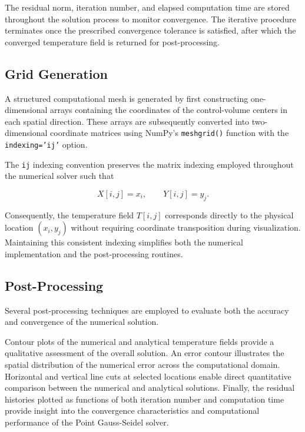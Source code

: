 The residual norm, iteration number, and elapsed computation time are stored throughout the solution process to monitor convergence. The iterative procedure terminates once the prescribed convergence tolerance is satisfied, after which the converged temperature field is returned for post-processing.


\subsection{Grid Generation}

A structured computational mesh is generated by first constructing one-dimensional arrays containing the coordinates of the control-volume centers in each spatial direction. These arrays are subsequently converted into two-dimensional coordinate matrices using NumPy's \texttt{meshgrid()} function with the \texttt{indexing='ij'} option.

The \texttt{ij} indexing convention preserves the matrix indexing employed throughout the numerical solver such that

\[
X[i,j]=x_i,
\qquad
Y[i,j]=y_j.
\]

Consequently, the temperature field $T[i,j]$ corresponds directly to the physical location $(x_i,y_j)$ without requiring coordinate transposition during visualization. Maintaining this consistent indexing simplifies both the numerical implementation and the post-processing routines.


\subsection{Post-Processing}

Several post-processing techniques are employed to evaluate both the accuracy and convergence of the numerical solution.

Contour plots of the numerical and analytical temperature fields provide a qualitative assessment of the overall solution. An error contour illustrates the spatial distribution of the numerical error across the computational domain. Horizontal and vertical line cuts at selected locations enable direct quantitative comparison between the numerical and analytical solutions. Finally, the residual histories plotted as functions of both iteration number and computation time provide insight into the convergence characteristics and computational performance of the Point Gauss-Seidel solver.

